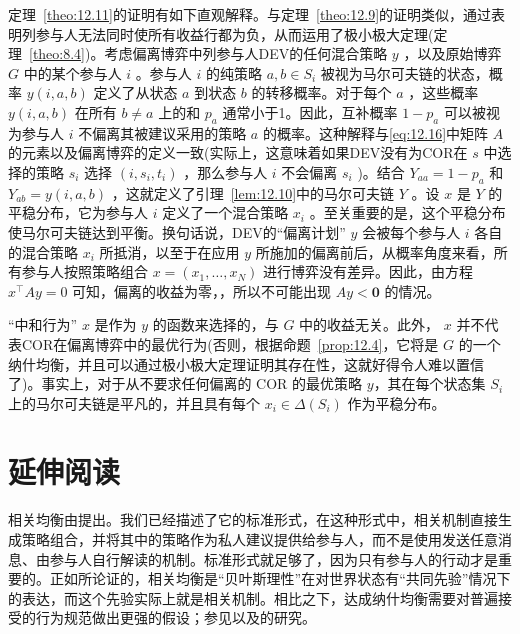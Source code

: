 定理~\ref{theo:12.11}的证明有如下直观解释。与定理~\ref{theo:12.9}的证明类似，通过表明列参与人无法同时使所有收益行都为负，从而运用了极小极大定理(定理~\ref{theo:8.4})。考虑偏离博弈中列参与人DEV的任何混合策略 \(y\) ，以及原始博弈 \(G\) 中的某个参与人 \(i\) 。参与人 \(i\) 的纯策略 \(a,b \in  {S}_{i}\) 被视为马尔可夫链的状态，概率 \(y\left( {i,a,b}\right)\) 定义了从状态 \(a\) 到状态 \(b\) 的转移概率。对于每个 \(a\) ，这些概率 \(y\left( {i,a,b}\right)\) 在所有 \(b \neq  a\) 上的和 \({p}_{a}\) 通常小于1。因此，互补概率 \(1 - {p}_{a}\) 可以被视为参与人 \(i\) 不偏离其被建议采用的策略 \(a\) 的概率。这种解释与\eqref{eq:12.16}中矩阵 \(A\) 的元素以及偏离博弈的定义一致(实际上，这意味着如果DEV没有为COR在 \(s\) 中选择的策略 \({s}_{i}\) 选择 \(\left( {i,{s}_{i},{t}_{i}}\right)\) ，那么参与人 \(i\) 不会偏离 \({s}_{i}\) )。结合 \({Y}_{aa} = 1 - {p}_{a}\) 和 \({Y}_{ab} = y\left( {i,a,b}\right)\) ，这就定义了引理~\ref{lem:12.10}中的马尔可夫链 \(Y\) 。设 \(x\) 是 \(Y\) 的平稳分布，它为参与人 \(i\) 定义了一个混合策略 \({x}_{i}\) 。至关重要的是，这个平稳分布使马尔可夫链达到平衡。换句话说，DEV的“偏离计划” \(y\) 会被每个参与人 \(i\) 各自的混合策略 \({x}_{i}\) 所抵消，以至于在应用 \(y\) 所施加的偏离前后，从概率角度来看，所有参与人按照策略组合 \(x = \left( {{x}_{1},\ldots ,{x}_{N}}\right)\) 进行博弈没有差异。因此，由方程 \({x}^{\top }{Ay} = 0\) 可知，偏离的收益为零，，所以不可能出现 \({Ay} < \bm{0}\) 的情况。

“中和行为” \(x\) 是作为 \(y\) 的函数来选择的，与 \(G\) 中的收益无关。此外， \(x\) 并不代表COR在偏离博弈中的最优行为(否则，根据命题~\ref{prop:12.4}，它将是 \(G\) 的一个纳什均衡，并且可以通过极小极大定理证明其存在性，这就好得令人难以置信了)。事实上，对于从不要求任何偏离的 COR 的最优策略 \(y\)，其在每个状态集 \({S}_{i}\) 上的马尔可夫链是平凡的，并且具有每个 \({x}_{i} \in \Delta \left( {S}_{i}\right)\) 作为平稳分布。


\section{延伸阅读}\label{sec12.6}

相关均衡由\citet{aumann1974}提出。我们已经描述了它的标准形式，在这种形式中，相关机制直接生成策略组合，并将其中的策略作为私人建议提供给参与人，而不是使用发送任意消息、由参与人自行解读的机制。标准形式就足够了，因为只有参与人的行动才是重要的\citep{aumann1987}。正如\citet{aumann1987}所论证的，相关均衡是“贝叶斯理性”在对世界状态有“共同先验”情况下的表达，而这个先验实际上就是相关机制。相比之下，达成纳什均衡需要对普遍接受的行为规范做出更强的假设；参见\citet{aumann1995}以及\citet{aumann2008}的研究。



